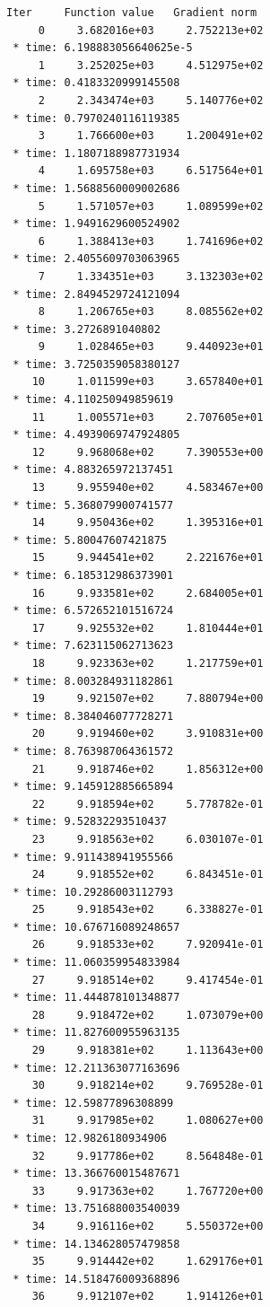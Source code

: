 \documentclass[12pt,a4paper]{article}
\begin{document}
\begin{lstlisting}
Iter     Function value   Gradient norm 
     0     3.682016e+03     2.752213e+02
 * time: 6.198883056640625e-5
     1     3.252025e+03     4.512975e+02
 * time: 0.4183320999145508
     2     2.343474e+03     5.140776e+02
 * time: 0.7970240116119385
     3     1.766600e+03     1.200491e+02
 * time: 1.1807188987731934
     4     1.695758e+03     6.517564e+01
 * time: 1.5688560009002686
     5     1.571057e+03     1.089599e+02
 * time: 1.9491629600524902
     6     1.388413e+03     1.741696e+02
 * time: 2.4055609703063965
     7     1.334351e+03     3.132303e+02
 * time: 2.8494529724121094
     8     1.206765e+03     8.085562e+02
 * time: 3.2726891040802
     9     1.028465e+03     9.440923e+01
 * time: 3.7250359058380127
    10     1.011599e+03     3.657840e+01
 * time: 4.110250949859619
    11     1.005571e+03     2.707605e+01
 * time: 4.4939069747924805
    12     9.968068e+02     7.390553e+00
 * time: 4.883265972137451
    13     9.955940e+02     4.583467e+00
 * time: 5.368079900741577
    14     9.950436e+02     1.395316e+01
 * time: 5.80047607421875
    15     9.944541e+02     2.221676e+01
 * time: 6.185312986373901
    16     9.933581e+02     2.684005e+01
 * time: 6.572652101516724
    17     9.925532e+02     1.810444e+01
 * time: 7.623115062713623
    18     9.923363e+02     1.217759e+01
 * time: 8.003284931182861
    19     9.921507e+02     7.880794e+00
 * time: 8.384046077728271
    20     9.919460e+02     3.910831e+00
 * time: 8.763987064361572
    21     9.918746e+02     1.856312e+00
 * time: 9.145912885665894
    22     9.918594e+02     5.778782e-01
 * time: 9.52832293510437
    23     9.918563e+02     6.030107e-01
 * time: 9.911438941955566
    24     9.918552e+02     6.843451e-01
 * time: 10.29286003112793
    25     9.918543e+02     6.338827e-01
 * time: 10.676716089248657
    26     9.918533e+02     7.920941e-01
 * time: 11.060359954833984
    27     9.918514e+02     9.417454e-01
 * time: 11.444878101348877
    28     9.918472e+02     1.073079e+00
 * time: 11.827600955963135
    29     9.918381e+02     1.113643e+00
 * time: 12.211363077163696
    30     9.918214e+02     9.769528e-01
 * time: 12.59877896308899
    31     9.917985e+02     1.080627e+00
 * time: 12.9826180934906
    32     9.917786e+02     8.564848e-01
 * time: 13.366760015487671
    33     9.917363e+02     1.767720e+00
 * time: 13.751688003540039
    34     9.916116e+02     5.550372e+00
 * time: 14.134628057479858
    35     9.914442e+02     1.629176e+01
 * time: 14.518476009368896
    36     9.912107e+02     1.914126e+01

\end{lstlisting}
\end{document}
